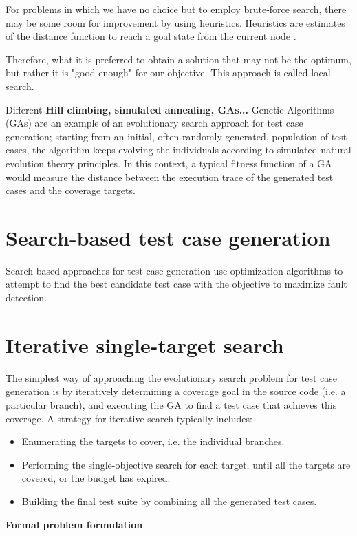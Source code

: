 For problems in which we have no choice but to employ brute-force search, there may be some room for improvement by using heuristics. Heuristics are estimates of the distance function to reach a goal state from the current node \cite{HeuristicSearch}.


Therefore, what it is preferred to obtain a solution that may not be the optimum, but rather it is "good enough" for our objective. This approach is called local search.




Different 
\textbf{Hill climbing, simulated annealing, GAs...}
Genetic Algorithms (GAs) are an example of an
evolutionary search approach for test case generation; starting from an initial, often randomly generated, population of 
test cases, the algorithm keeps evolving the individuals according to simulated natural evolution theory principles.
In this context, a typical fitness function of a GA would measure the distance between the execution trace of the generated test cases
and the coverage targets.


\section{Search-based test case generation}
Search-based approaches for test case generation use optimization algorithms to attempt to find 
the best candidate test case with the objective to maximize fault detection. 


\section{Iterative single-target search}
The simplest way of approaching the evolutionary search problem for test case generation is by iteratively determining a coverage goal in the source code (i.e. a particular branch), and executing the GA to find a test case that achieves this coverage. 
A strategy for iterative search typically includes:
\begin{itemize}
    \item Enumerating the targets to cover, i.e. the individual branches.
    \item Performing the single-objective search for each target, until all the targets are covered, or the budget has expired.
    \item Building the final test suite by combining all the generated test cases.
\end{itemize}

\textbf{Formal problem formulation}

